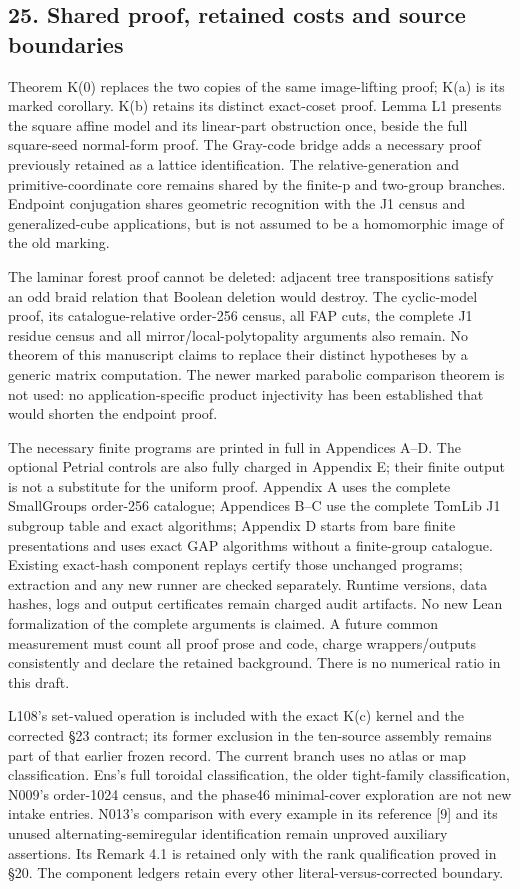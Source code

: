 \documentclass[
  10pt,
  letterpaper,
]{article}
\begin{document}
\subsection{25. Shared proof, retained costs and source
boundaries}\label{shared-proof-retained-costs-and-source-boundaries}

Theorem K(0) replaces the two copies of the same image-lifting proof;
K(a) is its marked corollary. K(b) retains its distinct exact-coset
proof. Lemma L1 presents the square affine model and its linear-part
obstruction once, beside the full square-seed normal-form proof. The
Gray-code bridge adds a necessary proof previously retained as a lattice
identification. The relative-generation and primitive-coordinate core
remains shared by the finite-p and two-group branches. Endpoint
conjugation shares geometric recognition with the J1 census and
generalized-cube applications, but is not assumed to be a homomorphic
image of the old marking.

The laminar forest proof cannot be deleted: adjacent tree transpositions
satisfy an odd braid relation that Boolean deletion would destroy. The
cyclic-model proof, its catalogue-relative order-256 census, all FAP
cuts, the complete J1 residue census and all mirror/local-polytopality
arguments also remain. No theorem of this manuscript claims to replace
their distinct hypotheses by a generic matrix computation. The newer
marked parabolic comparison theorem is not used: no application-specific
product injectivity has been established that would shorten the endpoint
proof.

The necessary finite programs are printed in full in Appendices A--D.
The optional Petrial controls are also fully charged in Appendix E;
their finite output is not a substitute for the uniform proof. Appendix
A uses the complete SmallGroups order-256 catalogue; Appendices B--C use
the complete TomLib J1 subgroup table and exact algorithms; Appendix D
starts from bare finite presentations and uses exact GAP algorithms
without a finite-group catalogue. Existing exact-hash component replays
certify those unchanged programs; extraction and any new runner are
checked separately. Runtime versions, data hashes, logs and output
certificates remain charged audit artifacts. No new Lean formalization
of the complete arguments is claimed. A future common measurement must
count all proof prose and code, charge wrappers/outputs consistently and
declare the retained background. There is no numerical ratio in this
draft.

L108's set-valued operation is included with the exact K(c) kernel and
the corrected §23 contract; its former exclusion in the ten-source
assembly remains part of that earlier frozen record. The current branch
uses no atlas or map classification. Ens's full toroidal classification,
the older tight-family classification, N009's order-1024 census, and the
phase46 minimal-cover exploration are not new intake entries. N013's
comparison with every example in its reference {[}9{]} and its unused
alternating-semiregular identification remain unproved auxiliary
assertions. Its Remark 4.1 is retained only with the rank qualification
proved in §20. The component ledgers retain every other
literal-versus-corrected boundary.
\end{document}
